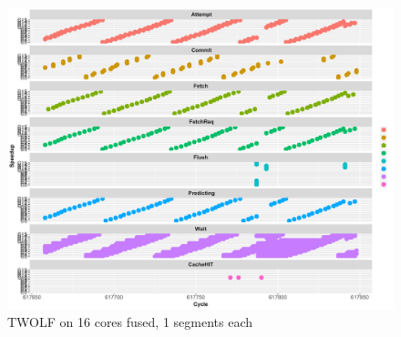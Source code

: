 \begin{figure}
\center
  \includegraphics[width=1\textwidth]{chapter3/graphics/twolf_16_1.pdf}
  \caption{TWOLF on 16 cores fused, 1 segments each}\label{fig:16step1}
\end{figure}

